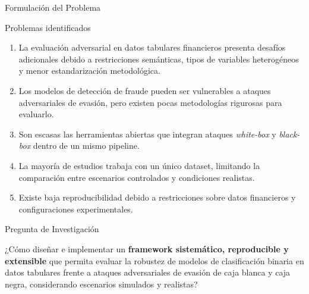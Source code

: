 \documentclass[aspectratio=169, 8pt]{beamer}
\begin{document}
\begin{frame}{Formulación del Problema}

\begin{block}{Problemas identificados}

\begin{enumerate}

\item La evaluación adversarial en datos tabulares financieros presenta desafíos adicionales debido a restricciones semánticas, tipos de variables heterogéneos y menor estandarización metodológica.

\vspace{0.1cm}

\item Los modelos de detección de fraude pueden
ser vulnerables a ataques adversariales de evasión,
pero existen pocas metodologías rigurosas
para evaluarlo.

\vspace{0.1cm}

\item Son escasas las herramientas abiertas que
integran ataques \textit{white-box} y
\textit{black-box} dentro de un mismo pipeline.

\vspace{0.1cm}

\item La mayoría de estudios trabaja con un único
dataset, limitando la comparación entre
escenarios controlados y condiciones realistas.

\vspace{0.1cm}

\item Existe baja reproducibilidad debido a
restricciones sobre datos financieros y
configuraciones experimentales.

\end{enumerate}

\end{block}

\vspace{0.2cm}

\begin{alertblock}{Pregunta de Investigación}

¿Cómo diseñar e implementar un
\textbf{framework sistemático, reproducible y extensible}
que permita evaluar la robustez de modelos
de clasificación binaria en datos tabulares
frente a ataques adversariales de evasión
de caja blanca y caja negra, considerando
escenarios simulados y realistas?

\end{alertblock}

\end{frame}
\end{document}
